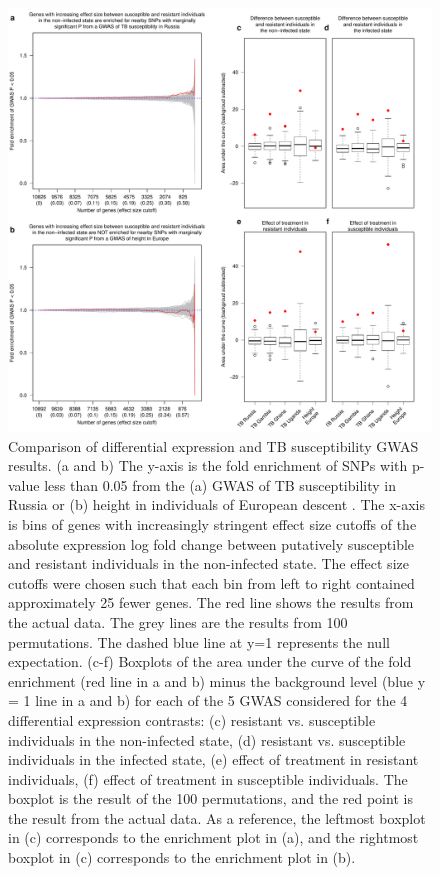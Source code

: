 \documentclass[fleqn,10pt]{wlscirep}
\begin{document}
\begin{figure}[p]
\centering
\includegraphics[width=\linewidth]{../figure/gwas-final.pdf}
\caption{
Comparison of differential expression and TB susceptibility GWAS
results. (a and b) The y-axis is the fold enrichment of SNPs with
p-value less than 0.05 from the (a) GWAS of TB susceptibility in
Russia \cite{Curtis2015} or (b) height in individuals of European
descent \cite{LangoAllen2010}. The x-axis is bins of genes with
increasingly stringent effect size cutoffs of the absolute expression
log fold change between putatively susceptible and resistant
individuals in the non-infected state. The effect size cutoffs were
chosen such that each bin from left to right contained approximately
25 fewer genes. The red line shows the results from the actual data.
The grey lines are the results from 100 permutations. The dashed blue
line at y=1 represents the null expectation. (c-f) Boxplots of the
area under the curve of the fold enrichment (red line in a and b)
minus the background level (blue y = 1 line in a and b) for each of
the 5 GWAS \cite{Curtis2015, Thye2010, Sobota2016} considered for the
4 differential expression contrasts: (c) resistant vs. susceptible
individuals in the non-infected state, (d) resistant vs. susceptible
individuals in the infected state, (e) effect of treatment in
resistant individuals, (f) effect of treatment in susceptible
individuals. The boxplot is the result of the 100 permutations, and
the red point is the result from the actual data. As a reference, the
leftmost boxplot in (c) corresponds to the enrichment plot in (a), and
the rightmost boxplot in (c) corresponds to the enrichment plot in
(b).
}
\label{fig:gwas}
\end{figure}
\end{document}
